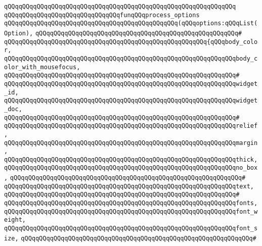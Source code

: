\verb|qQQqqQQqqQQqqQQqqQQqqQQqqQQqqQQqqQQqqQQqqQQqqQQqqQQqqQQqqQQqqQQq|\newline
\verb|qQQqqQQqqQQqqQQqqQQqqQQqqQQqqQQqfunqQQqprocess_options|\newline
\verb|qQQqqQQqqQQqqQQqqQQqqQQqqQQqqQQqqQQqqQQqqQQqqQQq(qQQqoptions:qQQqList(Option),|\newline
\verb|qQQqqQQqqQQqqQQqqQQqqQQqqQQqqQQqqQQqqQQqqQQqqQQqqQQqqQQq#|\newline
\verb|qQQqqQQqqQQqqQQqqQQqqQQqqQQqqQQqqQQqqQQqqQQqqQQqqQQqqQQq{qQQqbody_color,|\newline
\verb|qQQqqQQqqQQqqQQqqQQqqQQqqQQqqQQqqQQqqQQqqQQqqQQqqQQqqQQqqQQqqQQqbody_color_with_mousefocus,|\newline
\verb|qQQqqQQqqQQqqQQqqQQqqQQqqQQqqQQqqQQqqQQqqQQqqQQqqQQqqQQqqQQqqQQq#|\newline
\verb|qQQqqQQqqQQqqQQqqQQqqQQqqQQqqQQqqQQqqQQqqQQqqQQqqQQqqQQqqQQqqQQqwidget_id,|\newline
\verb|qQQqqQQqqQQqqQQqqQQqqQQqqQQqqQQqqQQqqQQqqQQqqQQqqQQqqQQqqQQqqQQqwidget_doc,|\newline
\verb|qQQqqQQqqQQqqQQqqQQqqQQqqQQqqQQqqQQqqQQqqQQqqQQqqQQqqQQqqQQqqQQq#|\newline
\verb|qQQqqQQqqQQqqQQqqQQqqQQqqQQqqQQqqQQqqQQqqQQqqQQqqQQqqQQqqQQqqQQqrelief,|\newline
\verb|qQQqqQQqqQQqqQQqqQQqqQQqqQQqqQQqqQQqqQQqqQQqqQQqqQQqqQQqqQQqqQQqmargin,|\newline
\verb|qQQqqQQqqQQqqQQqqQQqqQQqqQQqqQQqqQQqqQQqqQQqqQQqqQQqqQQqqQQqqQQqthick,|\newline
\verb|qQQqqQQqqQQqqQQqqQQqqQQqqQQqqQQqqQQqqQQqqQQqqQQqqQQqqQQqqQQqqQQqno_box,|\newline
\verb|qQQqqQQqqQQqqQQqqQQqqQQqqQQqqQQqqQQqqQQqqQQqqQQqqQQqqQQqqQQqqQQq#|\newline
\verb|qQQqqQQqqQQqqQQqqQQqqQQqqQQqqQQqqQQqqQQqqQQqqQQqqQQqqQQqqQQqqQQqtext,|\newline
\verb|qQQqqQQqqQQqqQQqqQQqqQQqqQQqqQQqqQQqqQQqqQQqqQQqqQQqqQQqqQQqqQQq#|\newline
\verb|qQQqqQQqqQQqqQQqqQQqqQQqqQQqqQQqqQQqqQQqqQQqqQQqqQQqqQQqqQQqqQQqfonts,|\newline
\verb|qQQqqQQqqQQqqQQqqQQqqQQqqQQqqQQqqQQqqQQqqQQqqQQqqQQqqQQqqQQqqQQqfont_weight,|\newline
\verb|qQQqqQQqqQQqqQQqqQQqqQQqqQQqqQQqqQQqqQQqqQQqqQQqqQQqqQQqqQQqqQQqfont_size,|\newline
\verb|qQQqqQQqqQQqqQQqqQQqqQQqqQQqqQQqqQQqqQQqqQQqqQQqqQQqqQQqqQQqqQQq#|\newline
